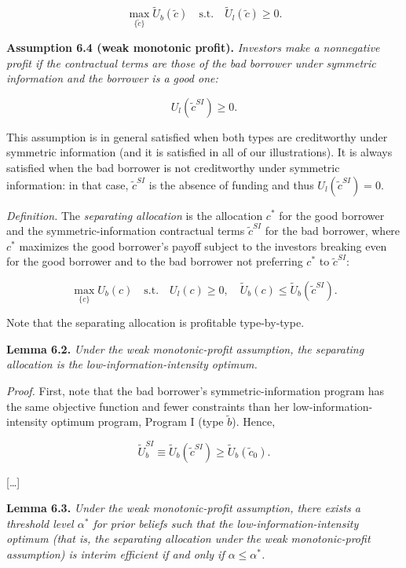 \documentclass[11pt,a4paper]{article}
\begin{document}
\[\max_{\{\tilde{c}\}} \tilde{U}_b(\tilde{c}) \quad \text{s.t.} \quad \tilde{U}_l(\tilde{c}) \geqslant 0.\]

\textbf{Assumption 6.4 (weak monotonic profit).} \emph{Investors make a nonnegative profit if the
contractual terms are those of the bad borrower under symmetric information and the borrower is a
good one:}

\[U_l(\tilde{c}^{SI}) \geqslant 0.\]

This assumption is in general satisfied when both types are creditworthy under symmetric information
(and it is satisfied in all of our illustrations). It is always satisfied when the bad borrower is
not creditworthy under symmetric information: in that case, \(\tilde{c}^{SI}\) is the absence of
funding and thus \(U_l(\tilde{c}^{SI}) = 0\).

\emph{Definition.} The \emph{separating allocation} is the allocation \(c^*\) for the good borrower
and the symmetric-information contractual terms \(\tilde{c}^{SI}\) for the bad borrower, where
\(c^*\) maximizes the good borrower's payoff subject to the investors breaking even for the good
borrower and to the bad borrower not preferring \(c^*\) to \(\tilde{c}^{SI}\):

\[\max_{\{c\}} U_b(c) \quad \text{s.t.} \quad U_l(c) \geqslant 0, \quad \tilde{U}_b(c) \leqslant \tilde{U}_b(\tilde{c}^{SI}).\]

Note that the separating allocation is profitable type-by-type.

\textbf{Lemma 6.2.} \emph{Under the weak monotonic-profit assumption, the separating allocation is
the low-information-intensity optimum.}

\emph{Proof.} First, note that the bad borrower's symmetric-information program has the same
objective function and fewer constraints than her low-information-intensity optimum program, Program
I (type \(\tilde{b}\)). Hence,

\[\tilde{U}_b^{SI} \equiv \tilde{U}_b(\tilde{c}^{SI}) \geqslant \tilde{U}_b(\tilde{c}_0).\]

{[}\ldots{]}

\textbf{Lemma 6.3.} \emph{Under the weak monotonic-profit assumption, there exists a threshold level
\(\alpha^*\) for prior beliefs such that the low-information-intensity optimum (that is, the
separating allocation under the weak monotonic-profit assumption) is interim efficient if and only
if \(\alpha \leqslant \alpha^*\).}
\end{document}

